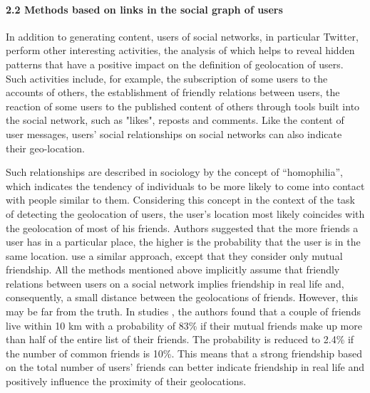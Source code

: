 \paragraph{2.2 Methods based on links in the social graph of users} In addition to generating content, users of social networks, in particular Twitter, perform other interesting activities, the analysis of which helps to reveal hidden patterns that have a positive impact on the definition of geolocation of users. Such activities include, for example, the subscription of some users to the accounts of others, the establishment of friendly relations between users, the reaction of some users to the published content of others through tools built into the social network, such as "likes", reposts and comments. Like the content of user messages, users' social relationships on social networks can also indicate their geo-location.

Such relationships are described in sociology by the concept of “homophilia”, which indicates the tendency of individuals to be more likely to come into contact with people similar to them. Considering this concept in the context of the task of detecting the geolocation of users, the user's location most likely coincides with the geolocation of most of his friends. Authors \cite{RenZhangLin} suggested that the more friends a user has in a particular place, the higher is the probability that the user is in the same location. \cite{DavisPappaDeOliveira} use a similar approach, except that they consider only mutual friendship. All the methods mentioned above implicitly assume that friendly relations between users on a social network implies friendship in real life and, consequently, a small distance between the geolocations of friends. However, this may be far from the truth. In studies \cite{KongLiuHuang}, the authors found that a couple of friends live within 10 km with a probability of 83\% if their mutual friends make up more than half of the entire list of their friends. The probability is reduced to 2.4\% if the number of common friends is 10\%. This means that a strong friendship based on the total number of users' friends can better indicate friendship in real life and positively influence the proximity of their geolocations.

